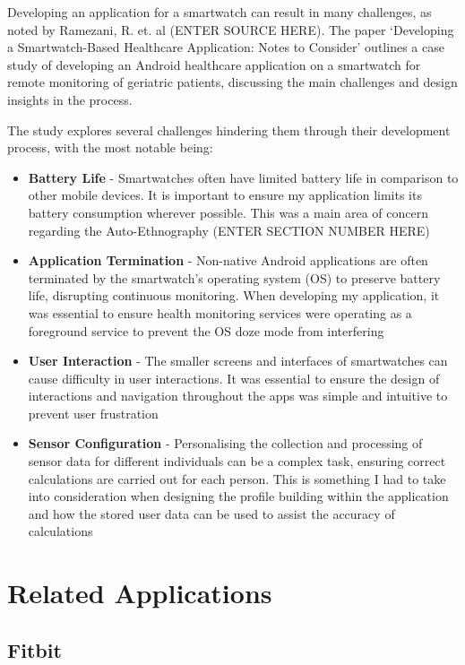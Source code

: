 \documentclass{l4proj}
\begin{document}
Developing an application for a smartwatch can result in many challenges, as noted by Ramezani, R. et. al (ENTER SOURCE HERE). The paper ‘Developing a Smartwatch-Based Healthcare Application: Notes to Consider’ outlines a case study of developing an Android healthcare application on a smartwatch for remote monitoring of geriatric patients, discussing the main challenges and design insights in the process.

The study explores several challenges hindering them through their development process, with the most notable being:

\begin{itemize}
    \item \textbf{Battery Life} - Smartwatches often have limited battery life in comparison to other mobile devices. It is important to ensure my application limits its battery consumption wherever possible. This was a main area of concern regarding the Auto-Ethnography (ENTER SECTION NUMBER HERE)
    \item \textbf{Application Termination} - Non-native Android applications are often terminated by the smartwatch’s operating system (OS) to preserve battery life, disrupting continuous monitoring. When developing my application, it was essential to ensure health monitoring services were operating as a foreground service to prevent the OS doze mode from interfering
    \item \textbf{User Interaction} - The smaller screens and interfaces of smartwatches can cause difficulty in user interactions. It was essential to ensure the design of interactions and navigation throughout the apps was simple and intuitive to prevent user frustration
    \item \textbf{Sensor Configuration} - Personalising the collection and processing of sensor data for different individuals can be a complex task, ensuring correct calculations are carried out for each person. This is something I had to take into consideration when designing the profile building within the application and how the stored user data can be used to assist the accuracy of calculations
\end{itemize}


\section{Related Applications}

\subsection{Fitbit}
\end{document}
